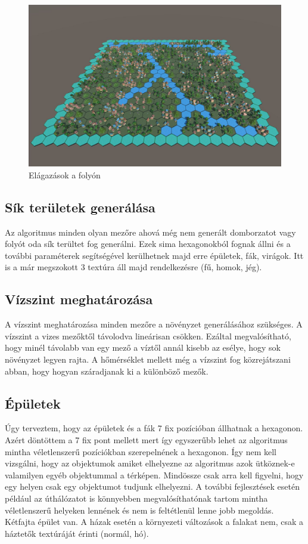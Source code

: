 \begin{figure}[h!]
\centering
\includegraphics[scale=0.3]{kepek/Branch.JPG}
\caption{Elágazások a folyón}
\label{fig:Branch}
\end{figure}

\subsection{Sík területek generálása}

Az algoritmus minden olyan mezőre ahová még nem generált domborzatot vagy folyót oda sík terültet fog generálni. Ezek sima hexagonokból fognak állni és a további paraméterek segítségével kerülhetnek majd erre épületek, fák, virágok. Itt is a már megszokott 3 textúra áll majd rendelkezésre (fű, homok, jég).

\subsection{Vízszint meghatározása}

A vízszint meghatározása minden mezőre a növényzet generálásához szükséges. A vízszint a vizes mezőktől távolodva lineárisan csökken. Ezáltal megvalósítható, hogy minél távolabb van egy mező a víztől annál kisebb az esélye, hogy sok növényzet legyen rajta. A hőmérséklet mellett még a vízszint fog közrejátszani abban, hogy hogyan száradjanak ki a különböző mezők.

\subsection{Épületek}

Úgy terveztem, hogy az épületek és a fák 7 fix pozícióban állhatnak a hexagonon. Azért döntöttem a 7 fix pont mellett mert így egyszerűbb lehet az algoritmus mintha véletlenszerű pozíciókban szerepelnének a hexagonon. Így nem kell vizsgálni, hogy az objektumok amiket elhelyezne az algoritmus azok ütköznek-e valamilyen egyéb objektummal a térképen. Mindössze csak arra kell figyelni, hogy egy helyen csak egy objektumot tudjunk elhelyezni. A további fejlesztések esetén például az úthálózatot is könnyebben megvalósíthatónak tartom mintha véletlenszerű helyeken lennének és nem is feltétlenül lenne jobb megoldás. Kétfajta épület van. A házak esetén a környezeti változások a falakat nem, csak a háztetők textúráját érinti (normál, hó).

